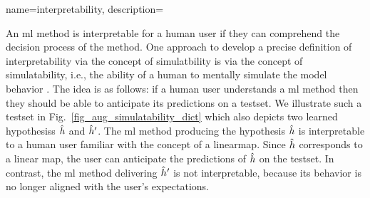  {name={interpretability},
 	description={An \gls{ml} method is interpretable for a 
 	human user if they can comprehend the decision process of the method. 
	One approach to develop a precise definition of interpretability via the concept of simulatbility 
 	is via the concept of simulatability, i.e., the ability of a human to mentally simulate the 
	\gls{model} behavior \cite{doshi2017towards,hase-bansal-2020-evaluating,Chen2018,Colin:2022aa,Lipton2018}. 
 	The idea is as follows: if a human user understands a \gls{ml} method then they should 
 	be able to anticipate its \glspl{prediction} on a \gls{testset}. We illustrate 
 	such a \gls{testset} in Fig.\ \ref{fig_aug_simulatability_dict} which also depicts 
	two learned \glspl{hypothesis} $\hat{h}$ and $\hat{h}'$. 
	The \gls{ml} method producing the \gls{hypothesis} $\hat{h}$ is interpretable
	to a human user familiar with the concept of a \gls{linearmap}. 
    Since $\hat{h}$ corresponds to a linear map, the user can 
	anticipate the \glspl{prediction} of $\hat{h}$ on the 
	\gls{testset}. In contrast, the \gls{ml} method delivering $\hat{h}'$ 
	is not interpretable, because its behavior is no longer aligned with the user’s 
	expectations.
 	\begin{figure}
 		\begin{center} 
\end{center}
\end{figure}}}
